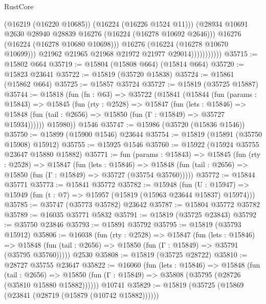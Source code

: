 \begin{lexlean}{RustCore}
\begin{coremodule}
                                (@16219 (@16220 @10685))
                                (@16224 (@16226 @1524 @11)))
                              (@28934
                                @10691
                                @2630
                                @28940
                                @28839
                                @16276
                                (@16224 (@16278 @10692 @2646)))
                              @16276
                              (@16224 (@16278 @10680 @10698)))
                            @16276
                            (@16224 (@16278 @10670 @10699)))
                          @21962
                          @21965
                          @21968
                          @21972
                          @21977
                          @29014)))))))))))
@35715 := @15802 @664
@35719 := @15804 (@15808 @664) (@15814 @664)
@35720 := @15823 @23641
@35722 := @15819 (@35720 @15838)
@35724 := @15861 (@15862 @664)
@35725 := @15857 @35724
@35727 := @15819 (@35725 @15887)
@35744 := @15818
    (fun (fn : @63) =>
    @35722
      (@15841
        (@15844
          (fun (params : @15843) =>
          @15845
            (fun (rty : @2528) =>
            @15847
              (fun (lets : @15846) =>
              @15848 (fun (tail : @2656) => @15850 (fun (Γ : @15849) => @35727 @15934))))))
        @15980))
    @1546
@35747 := @15986 (@35720 (@15836 @1546))
@35750 := @15899 (@15900 @1546) @23644
@35754 := @15819 (@15891 (@35750 @15908) @15912)
@35755 := @15925 @1546
@35760 := @15922 (@15924 @35755 @23647 @15880 @15882)
@35771 := fun (params : @15843) =>
  @15845
    (fun (rty : @2528) =>
    @15847
      (fun (lets : @15846) =>
      @15848 (fun (tail : @2656) => @15850 (fun (Γ : @15849) => @35727 (@35754 @35760)))))
@35772 := @15844 @35771
@35773 := @15841 @35772
@35782 := @15948
    (fun (U : @15947) => @15949 (fun (t : @7) => @15957 (@15819 (@15963 @23644 @15837) @15974)))
@35785 := @35747 (@35773 @35782) @23642
@35787 := @15804 @35772 @35782
@35789 := @16035 @35771 @5832
@35791 := @15819 (@35725 @23843)
@35792 := @35750 @23846
@35793 := @15891 @35792
@35795 := @15819 (@35793 @15912)
@35806 := @16038
    (fun (rty : @2528) =>
    @15847
      (fun (lets : @15846) =>
      @15848 (fun (tail : @2656) => @15850 (fun (Γ : @15849) => @35791 (@35795 @35760)))))
    @2530
@35808 := @15819 (@35725 @28722)
@35810 := @28727 @35755 @23647
@35822 := @16060
    (fun (lets : @15846) =>
    @15848
      (fun (tail : @2656) =>
      @15850 (fun (Γ : @15849) => @35808 (@35795 (@28726 (@35810 @15880 @15882))))))
    @10741
@35829 := @15819 (@35725 (@15869 (@23841 (@28719 (@15879 (@10742 @15882))))))

\end{coremodule}
\end{lexlean}
